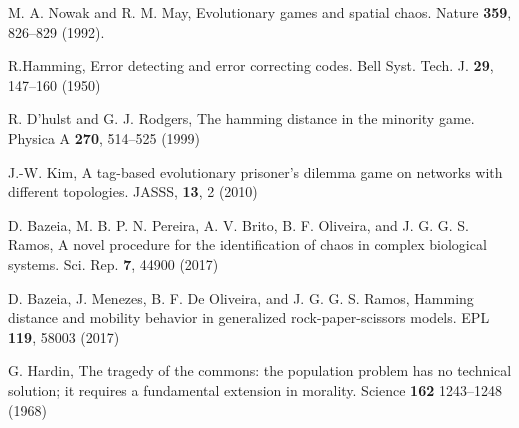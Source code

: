 \begin{thebibliography}{04}

M. A. Nowak and R. M. May,
Evolutionary games and spatial chaos. 
Nature \textbf{359}, 826--829 (1992).

\raggedright
R.Hamming,
Error detecting and error correcting codes.
Bell Syst. Tech. J. \textbf{29}, 147--160 
(1950)


\raggedright
R. D'hulst and G. J. Rodgers,
The hamming distance in the minority game.
Physica A \textbf{270}, 514--525 (1999) 


\raggedright
J.-W. Kim,
A tag-based evolutionary prisoner's dilemma game on networks with different topologies.
JASSS, \textbf{13}, 2 (2010)


\raggedright
D. Bazeia, M. B. P. N. Pereira, A. V. Brito, B. F. Oliveira, and J. G. G. S. Ramos,
A novel procedure for the identification of chaos in complex biological systems.
Sci. Rep. \textbf{7}, 44900 (2017)

\raggedright
D. Bazeia, J. Menezes, B. F. De Oliveira, and J. G. G. S. Ramos,
Hamming distance and mobility behavior in generalized rock-paper-scissors models.
EPL \textbf{119}, 58003 (2017)






\raggedright
G. Hardin,
The tragedy of the commons: the population problem has no technical solution; it requires a fundamental extension in morality.
Science \textbf{162} 1243--1248 (1968)



\end{thebibliography}
